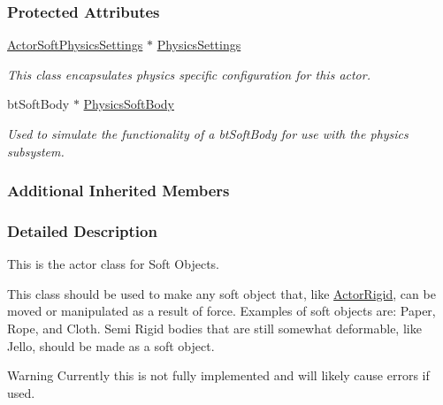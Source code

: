 \subsubsection*{Protected Attributes}
\begin{DoxyCompactItemize}
\item 
\hypertarget{classMezzanine_1_1ActorSoft_ab7ea9b20786fbd7505f836135c890434}{\hyperlink{classMezzanine_1_1ActorSoftPhysicsSettings}{Actor\-Soft\-Physics\-Settings} $\ast$ \hyperlink{classMezzanine_1_1ActorSoft_ab7ea9b20786fbd7505f836135c890434}{Physics\-Settings}}\label{classMezzanine_1_1ActorSoft_ab7ea9b20786fbd7505f836135c890434}

\begin{DoxyCompactList}\small\item\em This class encapsulates physics specific configuration for this actor. \end{DoxyCompactList}\item 
\hypertarget{classMezzanine_1_1ActorSoft_a4eb4bcfe665df0c4741f5c17ff268c88}{bt\-Soft\-Body $\ast$ \hyperlink{classMezzanine_1_1ActorSoft_a4eb4bcfe665df0c4741f5c17ff268c88}{Physics\-Soft\-Body}}\label{classMezzanine_1_1ActorSoft_a4eb4bcfe665df0c4741f5c17ff268c88}

\begin{DoxyCompactList}\small\item\em Used to simulate the functionality of a bt\-Soft\-Body for use with the physics subsystem. \end{DoxyCompactList}\end{DoxyCompactItemize}
\subsubsection*{Additional Inherited Members}


\subsubsection{Detailed Description}
This is the actor class for Soft Objects. 

This class should be used to make any soft object that, like \hyperlink{classMezzanine_1_1ActorRigid}{Actor\-Rigid}, can be moved or manipulated as a result of force. Examples of soft objects are\-: Paper, Rope, and Cloth. Semi Rigid bodies that are still somewhat deformable, like Jello, should be made as a soft object. \begin{DoxyWarning}{Warning}
Currently this is not fully implemented and will likely cause errors if used. 
\end{DoxyWarning}


